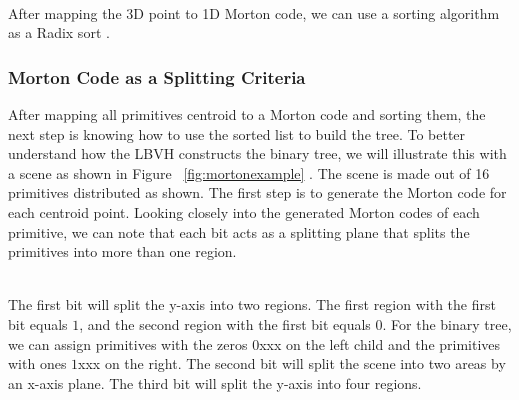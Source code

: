 \documentclass[11pt,a4paper]{article}
\begin{document}
\noindent
\\
After mapping the 3D point to 1D Morton code, we can use a sorting algorithm as a Radix sort \protect\cite{Karras2012}.

\subsubsection{Morton Code as a Splitting Criteria}
After mapping all primitives centroid to a Morton code and sorting them, the next step is knowing how to use the sorted list to build the tree. To better understand how the LBVH constructs the binary tree, we will illustrate this with a scene as shown in Figure ~\ref{fig:mortonexample}
. The scene is made out of 16 primitives distributed as shown. The first step is to generate the Morton code for each centroid point. Looking closely into the generated Morton codes of each primitive, we can note that each bit acts as a splitting plane that splits the primitives into more than one region. 

\noindent
\\
The first bit will split the y-axis into two regions. The first region with the first bit equals $1$, and the second region with the first bit equals $0$. For the binary tree, we can assign primitives with the zeros $0$xxx on the left child and the primitives with ones $1$xxx on the right. The second bit will split the scene into two areas by an x-axis plane. The third bit will split the y-axis into four regions.
\end{document}
